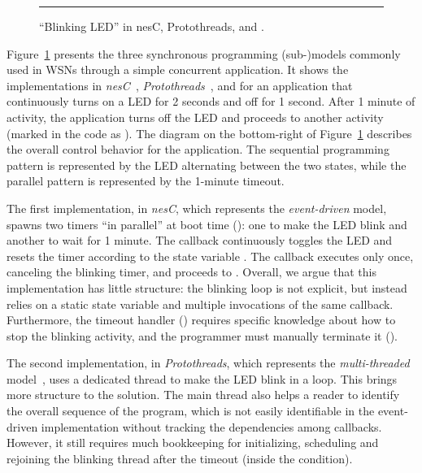 \begin{figure}[!t]
\begin{minipage}[t]{0.50\linewidth}
\end{minipage}
\rule{14cm}{0.37pt}
\caption{ ``Blinking LED'' in
    nesC,
    Protothreads,
    and \CEU. %
\label{lst.all}
}
\end{figure}

Figure~\ref{lst.all} presents the three synchronous programming (sub-)models 
commonly used in WSNs through a simple concurrent application.
It shows the implementations in \emph{nesC}~\cite{wsn.nesc}, 
\emph{Protothreads}~\cite{wsn.protothreads}, and \CEU for an application that 
continuously turns on a LED for 2 seconds and off for 1 second.
After 1 minute of activity, the application turns off the LED and proceeds to 
another activity (marked in the code as ).
The diagram on the bottom-right of Figure~\ref{lst.all} describes the overall 
control behavior for the application.
The sequential programming pattern is represented by the LED alternating between 
the two states, while the parallel pattern is represented by the 1-minute 
timeout.

The first implementation, in \emph{nesC}, which represents the 
\emph{event-driven} model, spawns two timers ``in parallel'' at boot time 
(): one to make the LED blink and another to wait for 1 
minute.
The callback  continuously toggles the LED and resets the timer 
according to the state variable .
The callback  executes only once, canceling the blinking timer, 
and proceeds to .
Overall, we argue that this implementation has little structure: the blinking 
loop is not explicit, but instead relies on a static state variable and 
multiple invocations of the same callback.
Furthermore, the timeout handler () requires specific knowledge 
about how to stop the blinking activity, and the programmer must manually 
terminate it ().

The second implementation, in \emph{Protothreads}, which represents the 
\emph{multi-threaded} model~\cite{wsn.protothreads,wsn.mantisos}, uses a 
dedicated thread to make the LED blink in a loop.
This brings more structure to the solution.
The main thread also helps a reader to identify the overall sequence of the 
program, which is not easily identifiable in the event-driven implementation 
without tracking the dependencies among callbacks.
However, it still requires much bookkeeping for initializing, scheduling and 
rejoining the blinking thread after the timeout (inside the  
condition).

